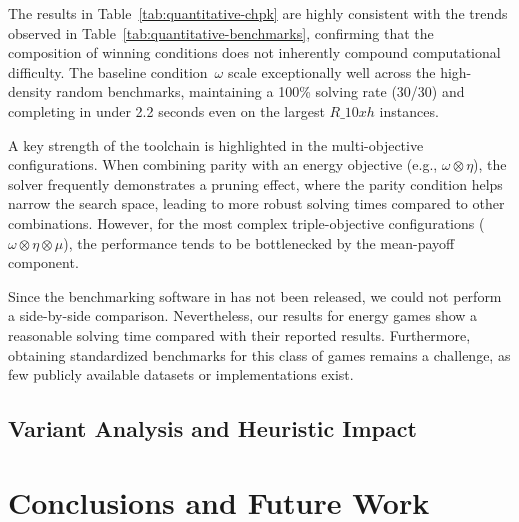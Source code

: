 \documentclass[a4paper,fleqn]{cas-sc}
\begin{document}
The results in Table~\ref{tab:quantitative-chpk} are highly consistent with the trends observed in Table~\ref{tab:quantitative-benchmarks}, confirming that the composition of winning conditions does not inherently compound computational difficulty. The baseline condition~$\omega$ scale exceptionally well across the high-density random benchmarks, maintaining a 100\% solving rate (30/30) and completing in under 2.2 seconds even on the largest $R\_10xh$ instances.

A key strength of the \noc toolchain is highlighted in the multi-objective configurations. When combining parity with an energy objective (e.g., $\omega \otimes \eta$), the solver frequently demonstrates a pruning effect, where the parity condition helps narrow the search space, leading to more robust solving times compared to other combinations. However, for the most complex triple-objective configurations ($\omega \otimes \eta \otimes \mu$), the performance tends to be bottlenecked by the mean-payoff component.

Since the benchmarking software in \cite{Chaloupka:2011} has not been released, we could not perform a side-by-side comparison. Nevertheless, our results for energy games show a reasonable solving time compared with their reported results.  Furthermore, obtaining standardized benchmarks for this class of games remains a challenge, as few publicly available datasets or implementations exist.


\subsection{Variant Analysis and Heuristic Impact}\label{sec:ablation_study}


\section{Conclusions and Future Work}\label{sec:conclusion}

\printcredits

%





\end{document}

